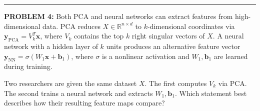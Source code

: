 \documentclass[12pt]{amsart}
\newcommand{\divider}{
  \vspace{-1em} %
  \noindent
  \raisebox{-0.15ex}{\textbullet}%
  \hspace{0.5em}%
  \rule[0.5ex]{0.95\textwidth}{1.0pt}%
  \hspace{0.5em}%
  \raisebox{-0.15ex}{\textbullet}%
  \vspace{0em} %
}
\begin{document}
%
\divider






{\bf PROBLEM 4:}
Both PCA and neural networks can extract features from high-dimensional data. PCA reduces 
$X \in \mathbb{R}^{n \times d}$ to $k$-dimensional coordinates via 
$\mathbf{y}_{\text{PCA}} = V_k^T \mathbf{x}$, where $V_k$ contains the top $k$ right singular 
vectors of $X$. A neural network with a hidden layer of $k$ units produces an alternative 
feature vector $\mathbf{y}_{\text{NN}} = \sigma(W_1 \mathbf{x} + \mathbf{b}_1)$, where 
$\sigma$ is a nonlinear activation and $W_1, \mathbf{b}_1$ are learned during training.

Two researchers are given the same dataset $X$. The first computes $V_k$ via PCA. The second 
trains a neural network and extracts $W_1, \mathbf{b}_1$. Which statement best describes how 
their resulting feature maps compare?
\end{document}
